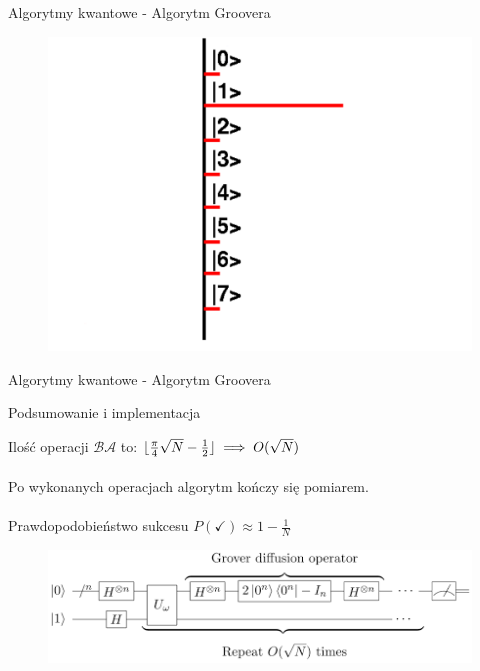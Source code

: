 \documentclass{beamer}
\DeclarePairedDelimiter\floor{\lfloor}{\rfloor}
\begin{document}
	
	\begin{frame}{Algorytmy kwantowe - Algorytm Groovera}
		\vspace{0.5em}
		\begin{center}
			\begin{figure}
				\includegraphics[scale=0.35]{media/visualization7.png}
			\end{figure}
		\end{center}
		\vspace{0.5em}
	\end{frame}	
		
	\begin{frame}{Algorytmy kwantowe - Algorytm Groovera}
		\vspace{0.5em}

	
		\begin{block}{Podsumowanie i implementacja}
			\vspace{0.5em}
			
			Ilość operacji $\mathcal{B}\mathcal{A}$ to: $\floor{\frac{\pi}{4}\sqrt{N} - \frac{1}{2}}\implies O(\sqrt{N})$ \\~\\
			Po wykonanych operacjach algorytm kończy się pomiarem.\\~\\
			Prawdopodobieństwo sukcesu $P(\checkmark) \approx 1 - \frac{1}{N} $
			\begin{center}
				\begin{figure}
					\includegraphics[scale=0.55]{media/groverCircuit.png}
				\end{figure}
			\end{center}
		\vspace{1em}	
		\end{block}
	\end{frame}
\end{document}
